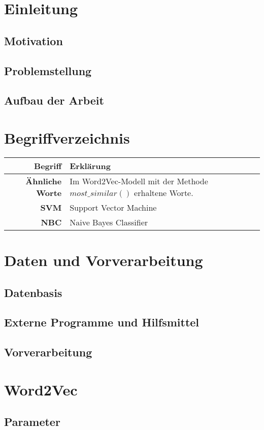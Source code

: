\documentclass[12pt,a4paper]{article}
\begin{document}
\tableofcontents
\newpage
\section{Einleitung}
	\subsection{Motivation}
	\subsection{Problemstellung}
	\subsection{Aufbau der Arbeit}
\newpage
\section{Begriffverzeichnis}
	\begin{tabular}{r|l}	
	\textbf{Begriff} & Erklärung\\
	\hline	
	\textbf{Ähnliche Worte} & Im Word2Vec-Modell mit der Methode $most\_similar()$ erhaltene Worte.\\
	\textbf{SVM} & Support Vector Machine\\
	\textbf{NBC} & Naive Bayes Classifier\\

\end{tabular}
\newpage
\section{Daten und Vorverarbeitung}
	\subsection{Datenbasis}
	\subsection{Externe Programme und Hilfsmittel}
	\subsection{Vorverarbeitung}
\newpage
\section{Word2Vec}
	\subsection{Parameter}
\end{document}

